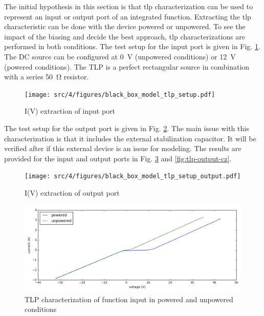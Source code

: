 The initial hypothesis in this section is that \gls{tlp} characterization can be used to represent an input or output port of an integrated function.
Extracting the \gls{tlp} characteristic can be done with the device powered or unpowered.
To see the impact of the biasing and decide the best approach, \gls{tlp} characterizations are performed in both conditions.
The test setup for the input port is given in Fig. \ref{fig:tlp-input-testbench}.
The DC source can be configured at \SI{0}{\volt} (unpowered conditions) or \SI{12}{\volt} (powered conditions).
The TLP is a perfect rectangular source in combination with a series \SI{50}{\ohm} resistor.

\begin{figure}[!h]
  \centering
  \texttt{[image: src/4/figures/black\_box\_model\_tlp\_setup.pdf]}
  \caption{I(V) extraction of input port}
  \label{fig:tlp-input-testbench}
\end{figure}

The test setup for the output port is given in Fig. \ref{fig:tlp-output-testbench}.
The main issue with this characterization is that it includes the external stabilization capacitor.
It will be verified after if this external device is an issue for modeling.
The results are provided for the input and output ports in Fig. \ref{fig:tlp-input-cz} and \ref{fig:tlp-output-cz}.

\begin{figure}[!h]
  \centering
  \texttt{[image: src/4/figures/black\_box\_model\_tlp\_setup\_output.pdf]}
  \caption{I(V) extraction of output port}
  \label{fig:tlp-output-testbench}
\end{figure}

\begin{figure}[!h]
  \centering
  \includegraphics[width=\textwidth]{src/4/figures/tlp_input_characterization.png}
  \caption{TLP characterization of function input in powered and unpowered conditions}
  \label{fig:tlp-input-cz}
\end{figure}

